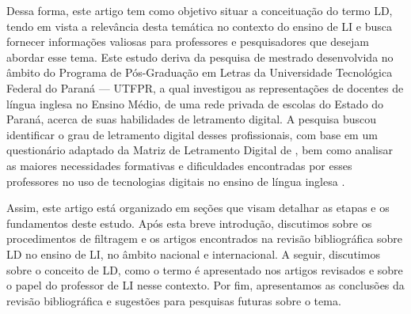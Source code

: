 Dessa forma, este artigo tem como objetivo situar a conceituação do
termo LD, tendo em vista a relevância desta temática no contexto do
ensino de LI e busca fornecer informações valiosas para professores e
pesquisadores que desejam abordar esse tema. Este estudo deriva da
pesquisa de mestrado desenvolvida no âmbito do Programa de Pós-Graduação
em Letras da Universidade Tecnológica Federal do Paraná --- UTFPR, a
qual investigou as representações de docentes de língua inglesa no
Ensino Médio, de uma rede privada de escolas do Estado do Paraná, acerca
de suas habilidades de letramento digital. A pesquisa buscou identificar
o grau de letramento digital desses profissionais, com base em um
questionário adaptado da Matriz de Letramento Digital de \textcite{dias2009matriz}, bem como analisar as maiores necessidades formativas e
dificuldades encontradas por esses professores no uso de tecnologias
digitais no ensino de língua inglesa \cite{farias2024letramento}.

Assim, este artigo está organizado em seções que visam detalhar as
etapas e os fundamentos deste estudo. Após esta breve introdução,
discutimos sobre os procedimentos de filtragem e os artigos encontrados
na revisão bibliográfica sobre LD no ensino de LI, no âmbito nacional e
internacional. A seguir, discutimos sobre o conceito de LD, como o termo
é apresentado nos artigos revisados e sobre o papel do professor de LI
nesse contexto. Por fim, apresentamos as conclusões da revisão
bibliográfica e sugestões para pesquisas futuras sobre o tema.
